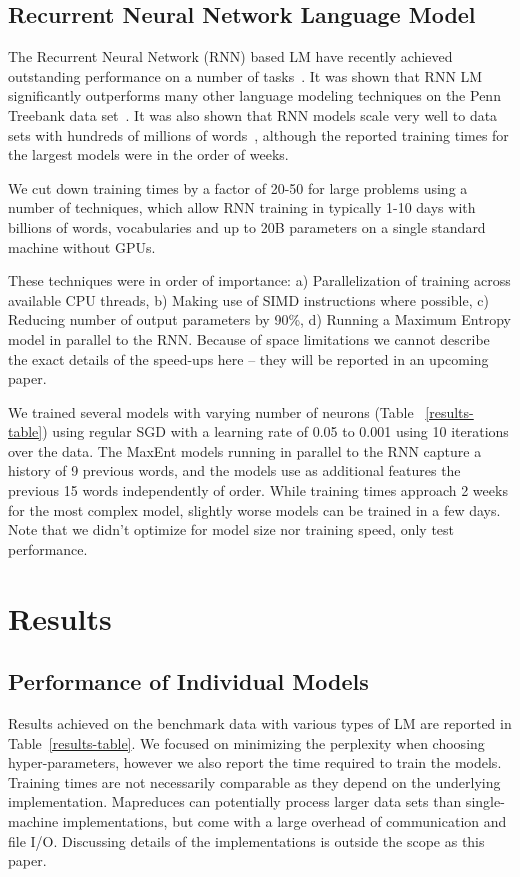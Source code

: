 \documentclass[11pt,letterpaper]{article}
\begin{document}
\subsection{Recurrent Neural Network Language Model}

The Recurrent Neural Network (RNN) based LM have recently achieved outstanding
performance on a number of tasks~\cite{Mikolov:2012}. It was shown that RNN LM significantly outperforms
many other language modeling techniques on the Penn Treebank data set~\cite{Mikolov:2011b}.
It was also shown that RNN models scale very well to data sets with hundreds of millions
of words~\cite{Mikolov:2011c}, although the reported training times for the largest models
were in the order of weeks.

We cut down training times by a factor of 20-50 for large problems using a
number of techniques, which allow RNN training in typically 1-10 days with
billions of words,  vocabularies and up to 20B parameters on a single
standard machine without GPUs.

These techniques were in order of importance:
a) Parallelization of training across available CPU threads,
b) Making use of SIMD instructions where possible,
c) Reducing number of output parameters by 90\%,
d) Running a Maximum Entropy model in parallel to the RNN.
Because of space limitations we cannot describe the exact details of the speed-ups here -- they will be reported in an upcoming paper.

We trained several models with varying number of neurons (Table ~\ref{results-table}) using regular SGD with a learning rate of 0.05 to 0.001 using 10 iterations over the data. The MaxEnt models running in parallel to the RNN capture a history of 9 previous words, and the models use as additional features the previous 15 words independently of order. While training times approach 2 weeks for the most complex model, slightly worse models can be trained in a few days. Note that we didn't optimize for model size nor training speed, only test performance.

\section{Results}

\subsection{Performance of Individual Models}

Results achieved on the benchmark data with various types of LM are reported
in Table~\ref{results-table}.
We focused on minimizing the perplexity when choosing
hyper-parameters, however we also report the time required to train the models.
Training times are not necessarily comparable as they depend on the underlying implementation. Mapreduces can potentially process larger data sets than single-machine implementations, but come with a large overhead of communication and file I/O. Discussing details of the implementations is outside the scope as this paper.
\end{document}
